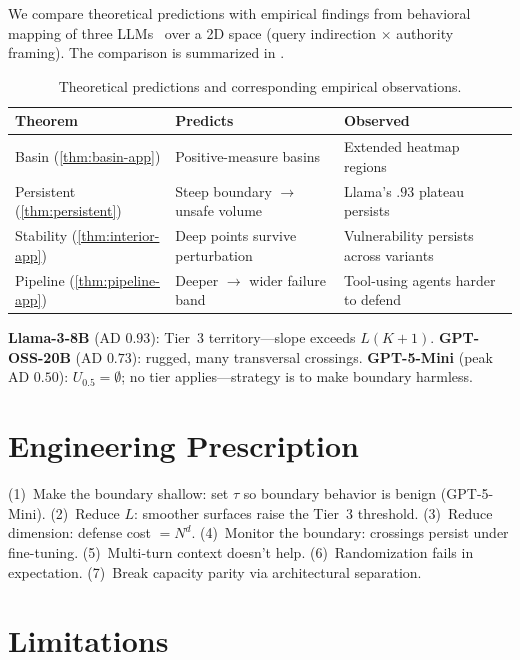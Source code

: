 \documentclass[11pt]{article}
\begin{document}
We compare theoretical predictions with empirical findings from behavioral mapping of three LLMs~\cite{bhatt2025manifold} over a 2D space (query indirection $\times$ authority framing). The comparison is summarized in .

\begin{table}[t]
\centering\small
\caption{Theoretical predictions and corresponding empirical observations.}
\label{tab:correspondence}
\begin{tabular}{@{}p{2.5cm}p{4cm}p{4.5cm}@{}}
\toprule
\textbf{Theorem} & \textbf{Predicts} & \textbf{Observed} \\
\midrule
Basin (\ref{thm:basin-app}) & Positive-measure basins & Extended heatmap regions \\[2pt]
Persistent (\ref{thm:persistent}) & Steep boundary $\to$ unsafe volume & Llama's $.93$ plateau persists \\[2pt]
Stability (\ref{thm:interior-app}) & Deep points survive perturbation & Vulnerability persists across variants \\[2pt]
Pipeline (\ref{thm:pipeline-app}) & Deeper $\to$ wider failure band & Tool-using agents harder to defend \\
\bottomrule
\end{tabular}
\end{table}

\textbf{Llama-3-8B} (AD $0.93$): Tier~3 territory---slope exceeds $L(K+1)$. \textbf{GPT-OSS-20B} (AD $0.73$): rugged, many transversal crossings. \textbf{GPT-5-Mini} (peak AD $0.50$): $U_{0.5} = \emptyset$; no tier applies---strategy is to make boundary harmless.

\section{Engineering Prescription}
\label{sec:engineering}

(1)~Make the boundary shallow: set $\tau$ so boundary behavior is benign (GPT-5-Mini). (2)~Reduce $L$: smoother surfaces raise the Tier~3 threshold. (3)~Reduce dimension: defense cost $= N^d$. (4)~Monitor the boundary: crossings persist under fine-tuning. (5)~Multi-turn context doesn't help. (6)~Randomization fails in expectation. (7)~Break capacity parity via architectural separation.

\section{Limitations}
\label{sec:limitations}
\end{document}
